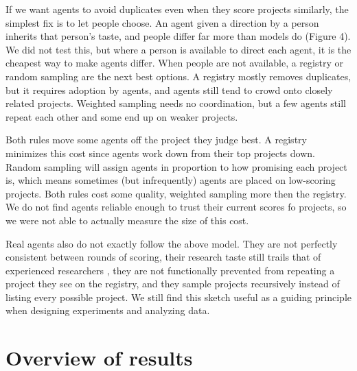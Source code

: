 \documentclass[11pt]{article}
\begin{document}
If we want agents to avoid duplicates even when they score projects
similarly, the simplest fix is to let people choose. An agent given a
direction by a person inherits that person's taste, and people differ
far more than models do (Figure 4). We did not test this, but where a
person is available to direct each agent, it is the cheapest way to make
agents differ. When people are not available, a registry or random
sampling are the next best options. A registry mostly removes
duplicates, but it requires adoption by agents, and agents still tend to
crowd onto closely related projects. Weighted sampling needs no
coordination, but a few agents still repeat each other and some end up
on weaker projects.

Both rules move some agents off the project they judge best. A registry
minimizes this cost since agents work down from their top projects down.
Random sampling will assign agents in proportion to how promising each
project is, which means sometimes (but infrequently) agents are placed
on low-scoring projects. Both rules cost some quality, weighted sampling
more then the registry. We do not find agents reliable enough to trust
their current scores fo projects, so we were not able to actually
measure the size of this cost.

Real agents also do not exactly follow the above model. They are not
perfectly consistent between rounds of scoring, their research taste
still trails that of experienced researchers \citep{baig2026taste}, they
are not functionally prevented from repeating a project they see on the
registry, and they sample projects recursively instead of listing every
possible project. We still find this sketch useful as a guiding
principle when designing experiments and analyzing data.

\section{Overview of
results}\label{agents-choosing-alone-crowd-onto-a-few-projects-and-a-registry-or-weighted-sampling-spreads-them-out}
\end{document}
